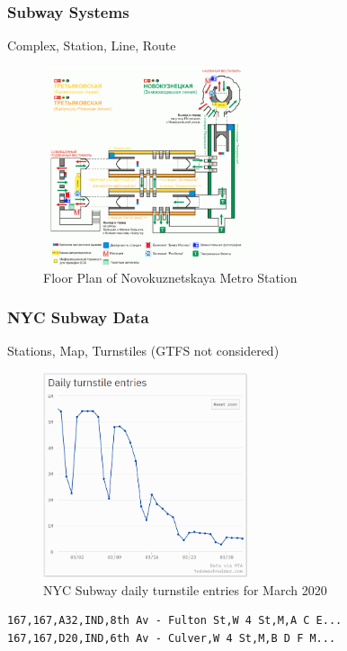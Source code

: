 \documentclass{beamer}
\begin{document}
\begin{frame}
\frametitle{Subway Systems}
Complex, Station, Line, Route
\begin{figure}
    \includegraphics[width=6cm]{Scratch_Visuals/Novokuznetskaya.png}
    \caption{Floor Plan of Novokuznetskaya Metro Station \cite{Novokuznetskaya}}
\end{figure}
\end{frame}
\begin{frame}[fragile, shrink=5]
\frametitle{NYC Subway Data}
Stations, Map, Turnstiles (GTFS not considered)
\begin{figure}
    \includegraphics[width=6cm]{Scratch_Visuals/schneider_ridership.png}
    \caption{NYC Subway daily turnstile entries for March 2020 \cite{toddwschneider}}
\end{figure}
\begin{verbatim}
167,167,A32,IND,8th Av - Fulton St,W 4 St,M,A C E...
167,167,D20,IND,6th Av - Culver,W 4 St,M,B D F M...
\end{verbatim}
\end{frame}
\end{document}

